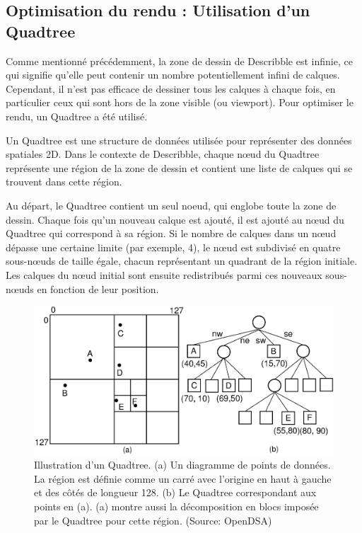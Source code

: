 \subsection{Optimisation du rendu : Utilisation d'un Quadtree}

Comme mentionné précédemment, la zone de dessin de \gls{Describble} est infinie, ce qui signifie qu'elle peut contenir un nombre potentiellement infini de calques. Cependant, il n'est pas efficace de dessiner tous les calques à chaque fois, en particulier ceux qui sont hors de la zone visible (ou \guillemotleft viewport\guillemotright). Pour optimiser le rendu, un Quadtree a été utilisé.

Un Quadtree est une structure de données utilisée pour représenter des données spatiales 2D. Dans le contexte de \gls{Describble}, chaque n\oe{}ud du Quadtree représente une région de la zone de dessin et contient une liste de calques qui se trouvent dans cette région.

Au départ, le Quadtree contient un seul noeud, qui englobe toute la zone de dessin. Chaque fois qu'un nouveau calque est ajouté, il est ajouté au n\oe{}ud du Quadtree qui correspond à sa région. Si le nombre de calques dans un n\oe{}ud dépasse une certaine limite (par exemple, 4), le n\oe{}ud est subdivisé en quatre sous-n\oe{}uds de taille égale, chacun représentant un quadrant de la région initiale. Les calques du n\oe{}ud initial sont ensuite redistribués parmi ces nouveaux sous-n\oe{}uds en fonction de leur position.

\begin{figure}[H]
    \centering
    \includegraphics[width=\textwidth]{assets/figures/quadtree.png}
    \caption{Illustration d'un Quadtree. (a) Un diagramme de points de données. La région est définie comme un carré avec l'origine en haut à gauche et des côtés de longueur 128. (b) Le Quadtree correspondant aux points en (a). (a) montre aussi la décomposition en blocs imposée par le Quadtree pour cette région. (Source: OpenDSA\cite{opendsaprojectPRQuadtreeData})}
    \label{fig:quadtree}
\end{figure}

